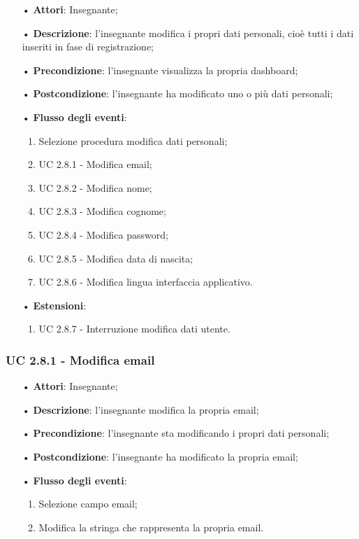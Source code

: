 \begin{itemize}
	\item[•] \textbf{Attori}: Insegnante;
	\item[•] \textbf{Descrizione}: l'insegnante modifica i propri dati personali, cioè tutti i dati inseriti in fase di registrazione;
	\item[•] \textbf{Precondizione}: l'insegnante visualizza la propria dashboard;
	\item[•] \textbf{Postcondizione}: l'insegnante ha modificato uno o più dati personali;
	\item[•] \textbf{Flusso degli eventi}:
	\begin{enumerate}
		\item Selezione procedura modifica dati personali;
		\item UC 2.8.1 - Modifica email;
		\item UC 2.8.2 - Modifica nome;
		\item UC 2.8.3 - Modifica cognome;
		\item UC 2.8.4 - Modifica password;
		\item UC 2.8.5 - Modifica data di nascita;
		\item UC 2.8.6 - Modifica lingua interfaccia applicativo.
	\end{enumerate}
	\item[•] \textbf{Estensioni}:	
	\begin{enumerate}
		\item UC 2.8.7 - Interruzione modifica dati utente.
	\end{enumerate}
\end{itemize}

\subsubsection{UC 2.8.1 - Modifica email}
\begin{itemize}
	\item[•]\textbf{Attori}: Insegnante;
	\item[•]\textbf{Descrizione}: l'insegnante modifica la propria email;
	\item[•]\textbf{Precondizione}: l'insegnante sta modificando i propri dati personali;
	\item[•]\textbf{Postcondizione}: l'insegnante ha modificato la propria email; 
	\item[•]\textbf{Flusso degli eventi}: 
	\begin{enumerate}
		\item Selezione campo email;
		\item Modifica la stringa che rappresenta la propria email.
	\end{enumerate}
\end{itemize}

